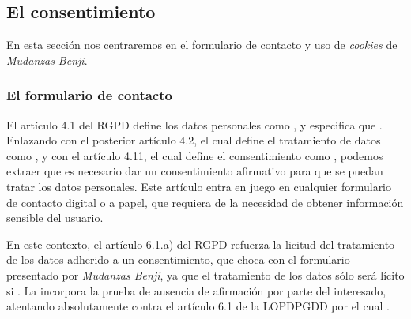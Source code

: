 \documentclass[es]{uc3mreport}
\begin{document}
\begin{report}
        \subsection{El consentimiento}
        En esta sección nos centraremos en el formulario de contacto y uso de \textit{cookies} de \textit{Mudanzas Benji}.

        \newpage
        \subsubsection{El formulario de contacto}
        El artículo 4.1 del RGPD define los datos personales como , y especifica que . Enlazando con el posterior artículo 4.2, el cual define el tratamiento de datos como , y con el artículo 4.11, el cual define el consentimiento como , podemos extraer que es necesario dar un consentimiento afirmativo para que se puedan tratar los datos personales. Este artículo entra en juego en cualquier formulario de contacto digital o a papel, que requiera de la necesidad de obtener información sensible del usuario.

        En este contexto, el artículo 6.1.a) del RGPD refuerza la licitud del tratamiento de los datos adherido a un consentimiento, que choca con el formulario presentado por \textit{Mudanzas Benji}, ya que el tratamiento de los datos sólo será lícito si . La  incorpora la prueba de ausencia de afirmación por parte del interesado, atentando absolutamente contra el artículo 6.1 de la LOPDPGDD por el cual .


\end{report}
\end{document}
